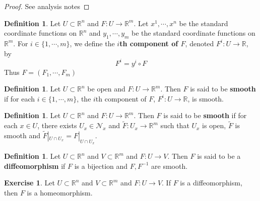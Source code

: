 \documentclass{book}
\theoremstyle{definition}
\newtheorem{defn}[definition]{Definition}
\newtheorem{ex}[definition]{Exercise}
\newcommand{\R}{\mathbb{R}}
\newcommand{\MN}{\mathcal{N}}
\newcommand{\tF}{\tilde{F}}
\DeclareMathOperator*{\0}{\mbf{0}}
\DeclareMathOperator*{\1}{\mbf{1}}
\begin{document}
	\begin{proof}
	See analysis notes
	\end{proof}


	\begin{defn}
	Let $U \subset \R^n$ and $F: U \rightarrow \R^m$. Let $x^1, \cdots, x^n$ be the standard coordinate functions on $\R^n$ and $y_1, \cdots, y_m$ be the standard coordinate functions on $\R^m$. For $i \in \{1, \cdots, m\}$, we define the \textbf{$i$th component of $F$}, denoted $F^i: U \rightarrow \R$, by $$F^i = y^i \circ F$$ 
	Thus $F = (F_1, \cdots, F_m)$
	\end{defn}
	
	\begin{defn}
	Let $U \subset \R^n$ be open and $F: U \rightarrow \R^m$. Then $F$ is said to be \textbf{smooth} if for each $i \in \{1, \cdots, m\}$, the $i$th component of $F$, $F^i: U \rightarrow \R$, is smooth.
	\end{defn}

	\begin{defn}
		Let $U \subset \R^n$ and $F: U \rightarrow \R^m$. Then $F$ is said to be \textbf{smooth} if for each $x \in U$, there exists $U_x \in \MN_x$ and $\tF : U_x \rightarrow \R^m$ such that $U_x$ is open, $\tF$ is smooth and $\tF|_{U \cap U_x} = F|_{U \cap U_x}$.
	\end{defn}

	\begin{defn}
		Let $U \subset \R^n$ and $V \subset \R^m$ and $F: U \rightarrow V$. Then $F$ is said to be a  \textbf{diffeomorphism} if $F$ is a bijection and $F, F^{-1}$ are smooth. 
	\end{defn}
	
	\begin{ex}
	Let $U \subset \R^n$ and $V \subset \R^m$ and $F: U \rightarrow V$. If $F$ is a diffeomorphism, then $F$ is a homeomorphism.
	\end{ex}
	
\end{document}
